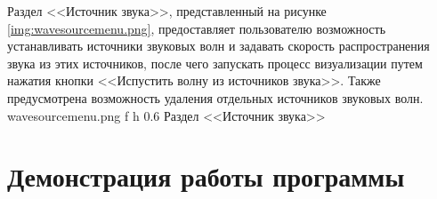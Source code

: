 \clearpage

Раздел <<Источник звука>>, представленный на рисунке \ref{img:wavesourcemenu.png}, предоставляет пользователю возможность устанавливать источники звуковых волн и задавать скорость распространения звука из этих источников, после чего запускать процесс визуализации путем нажатия кнопки <<Испустить волну из источников звука>>.
Также предусмотрена возможность удаления отдельных источников звуковых волн.
	{wavesourcemenu.png}
	{f}
	{h}
	{0.6\textwidth}
	{Раздел <<Источник звука>>}

\section{Демонстрация работы программы}

